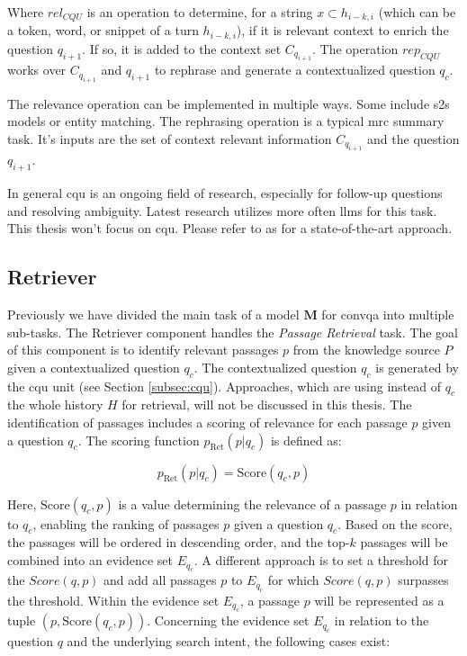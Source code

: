 Where $rel_{CQU}$ is an operation to determine, for a string $x \subset h_{i-k,i}$ (which can be a token, word, or snippet of a turn $h_{i-k,i}$), if it is relevant context to enrich the question $q_{i+1}$. If so, it is added to the context set $C_{q_{i+1}}$. The operation $rep_{CQU}$ works over $C_{q_{i+1}}$ and $q_{i+1}$ to rephrase and generate a contextualized question $q_c$.

The relevance operation can be implemented in multiple ways. Some include \gls{s2s} models or entity matching. The rephrasing operation is a typical \gls{mrc} summary task. It's inputs are the set of context relevant information $C_{q_{i+1}}$ and the question $q_{i+1}$.

In general \gls{cqu} is an ongoing field of research, especially for follow-up questions and resolving ambiguity. Latest research utilizes more often \gls{llm}s for this task. This thesis won't focus on \gls{cqu}. Please refer to \cite{mao_large_2023} as for a state-of-the-art approach.

\subsection{Retriever}
\label{subsec:retriever}

Previously we have divided the main task of a model $\mathbf{M}$ for \gls{convqa} into multiple sub-tasks. The Retriever component handles the \textit{Passage Retrieval} task. The goal of this component is to identify relevant passages $p$ from the knowledge source $P$ given a contextualized question $q_c$. The contextualized question $q_c$ is generated by the \gls{cqu} unit (see Section \ref{subsec:cqu}). Approaches, which are using instead of $q_c$ the whole history $H$ for retrieval, will not be discussed in this thesis. The identification of passages includes a scoring of relevance for each passage $p$ given a question $q_c$. The scoring function $p_{\text{Ret}}(p|q_c)$ is defined as:

\begin{equation}
    p_{\text{Ret}}(p|q_c) = \text{Score}(q_c,p)
    \label{eq:retriever}
\end{equation}

Here, $\text{Score}(q_c,p)$ is a value determining the relevance of a passage $p$ in relation to $q_c$, enabling the ranking of passages $p$ given a question $q_c$. Based on the score, the passages will be ordered in descending order, and the top-$k$ passages will be combined into an evidence set $E_{q_c}$. A different approach is to set a threshold for the $Score(q,p)$ and add all passages $p$ to $E_{q_c}$ for which $Score(q,p)$ surpasses the threshold. Within the evidence set $E_{q_c}$, a passage $p$ will be represented as a tuple $(p, \text{Score}(q_c,p))$. Concerning the evidence set $E_{q_c}$ in relation to the question $q$ and the underlying search intent, the following cases exist:


